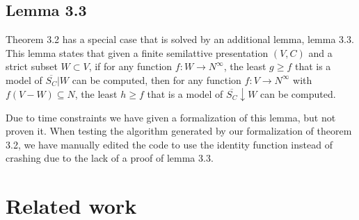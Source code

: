 \subsection{Lemma 3.3}

Theorem 3.2 has a special case that is solved by an additional lemma,
lemma 3.3. This lemma states that given a finite semilattive presentation
$(V, C)$ and a strict subset $W \subset V$, if for any function
$f : W \rightarrow N^{\infty}$, the least $g \ge f$ that is a model of
$\overline{S_C}|W$ can be computed, then for any function
$f : V \rightarrow N^{\infty}$ with $f(V - W) \subseteq N$,
the least $h \ge f$ that is a model of $\overline{S_C}\downarrow W$ can be computed.

Due to time constraints we have given a formalization of this lemma,
but not proven it.
When testing the algorithm generated by our formalization of theorem 3.2,
we have manually edited the code to use the identity function instead of crashing due to
the lack of a proof of lemma 3.3.

\section{Related work}
